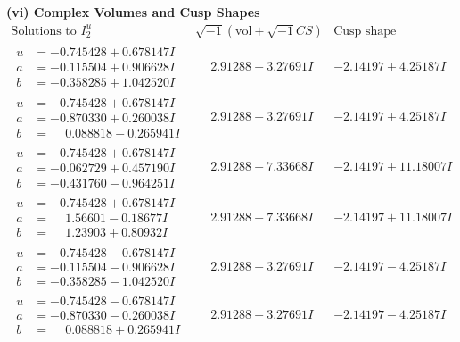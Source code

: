 \documentclass[1p]{elsarticle_modified}
\theoremstyle{definition}
\newcommand{\I}{\sqrt{-1}}
\begin{document}
\newpage\flushleft \textbf{(vi) Complex Volumes and Cusp Shapes}
$$\begin{array}{c|c|c}  
\text{Solutions to }I^u_{2}& \I (\text{vol} + \sqrt{-1}CS) & \text{Cusp shape}\\
 \hline 
\begin{aligned}
u &= -0.745428 + 0.678147 I \\
a &= -0.115504 + 0.906628 I \\
b &= -0.358285 + 1.042520 I\end{aligned}
 & \phantom{-}2.91288 - 3.27691 I & -2.14197 + 4.25187 I \\ \hline\begin{aligned}
u &= -0.745428 + 0.678147 I \\
a &= -0.870330 + 0.260038 I \\
b &= \phantom{-}0.088818 - 0.265941 I\end{aligned}
 & \phantom{-}2.91288 - 3.27691 I & -2.14197 + 4.25187 I \\ \hline\begin{aligned}
u &= -0.745428 + 0.678147 I \\
a &= -0.062729 + 0.457190 I \\
b &= -0.431760 - 0.964251 I\end{aligned}
 & \phantom{-}2.91288 - 7.33668 I & -2.14197 + 11.18007 I \\ \hline\begin{aligned}
u &= -0.745428 + 0.678147 I \\
a &= \phantom{-}1.56601 - 0.18677 I \\
b &= \phantom{-}1.23903 + 0.80932 I\end{aligned}
 & \phantom{-}2.91288 - 7.33668 I & -2.14197 + 11.18007 I \\ \hline\begin{aligned}
u &= -0.745428 - 0.678147 I \\
a &= -0.115504 - 0.906628 I \\
b &= -0.358285 - 1.042520 I\end{aligned}
 & \phantom{-}2.91288 + 3.27691 I & -2.14197 - 4.25187 I \\ \hline\begin{aligned}
u &= -0.745428 - 0.678147 I \\
a &= -0.870330 - 0.260038 I \\
b &= \phantom{-}0.088818 + 0.265941 I\end{aligned}
 & \phantom{-}2.91288 + 3.27691 I & -2.14197 - 4.25187 I \\ \hline\begin{aligned}

\end{aligned}
\end{array}$$
\end{document}

